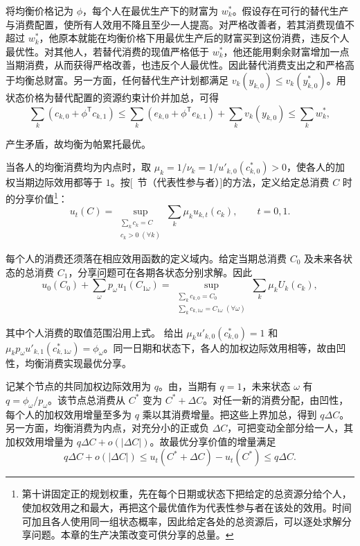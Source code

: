 \begin{solution}[label-content={证明},blank-type=none]
将均衡价格记为 $\phi$，每个人在最优生产下的财富为 $w_k^*$。假设存在可行的替代生产与消费配置，使所有人效用不降且至少一人提高。对严格改善者，若其消费现值不超过 $w_k^*$，他原本就能在均衡价格下用最优生产后的财富买到这份消费，违反个人最优性。对其他人，若替代消费的现值严格低于 $w_k^*$，他还能用剩余财富增加一点当期消费，从而获得严格改善，也违反个人最优性。因此替代消费支出之和严格高于均衡总财富。另一方面，任何替代生产计划都满足 $v_k(y_{k,0})\le v_k(y_{k,0}^*)$。用状态价格为替代配置的资源约束计价并加总，可得
\[
 \sum_k(c_{k,0}+\phi^{\mathsf T}c_{k,1})
 \le\sum_k(e_{k,0}+\phi^{\mathsf T}e_{k,1})+\sum_kv_k(y_{k,0})
 \le\sum_kw_k^*,
\]

产生矛盾，故均衡为帕累托最优。

当各人的均衡消费均为内点时，取 $\mu_k=1/\nu_k=1/u'_{k,0}(c_{k,0}^*)>0$，使各人的加权当期边际效用都等于 $1$。按[~节（代表性参与者）]的方法，定义给定总消费 $C$ 时的分享价值\footnote{第十讲固定正的规划权重，先在每个日期或状态下把给定的总资源分给个人，使加权效用之和最大，再把这个最优值作为代表性参与者在该处的效用。时间可加且各人使用同一组状态概率，因此给定各处的总资源后，可以逐处求解分享问题。本章的生产决策改变可供分享的总量。}：
\[
 u_t(C)=\sup_{\substack{\sum_k c_k=C\\ c_k>0\;(\forall k)}}
        \sum_k\mu_k u_{k,t}(c_k),\qquad t=0,1.
\]

每个人的消费还须落在相应效用函数的定义域内。给定当期总消费 $C_0$ 及未来各状态的总消费 $C_1$，分享问题可在各期各状态分别求解。因此
\[
 u_0(C_0)+\sum_\omega p_\omega u_1(C_{1\omega})
 =\sup_{\substack{\sum_k c_{k,0}=C_0\\
                  \sum_k c_{k,1\omega}=C_{1\omega}\;(\forall\omega)}}
   \sum_k\mu_k U_k(c_k),
\]

其中个人消费的取值范围沿用上式。 给出 $\mu_k u'_{k,0}(c_{k,0}^*)=1$ 和 $\mu_k p_\omega u'_{k,1}(c_{k,1\omega}^*)=\phi_\omega$。同一日期和状态下，各人的加权边际效用相等，故由凹性，均衡消费实现最优分享。

记某个节点的共同加权边际效用为 $q$。由，当期有 $q=1$，未来状态 $\omega$ 有 $q=\phi_\omega/p_\omega$。该节点总消费从 $C^*$ 变为 $C^*+\Delta C$。对任一新的消费分配，由凹性，每个人的加权效用增量至多为 $q$ 乘以其消费增量。把这些上界加总，得到 $q\Delta C$。另一方面，均衡消费为内点，对充分小的正或负 $\Delta C$，可把变动全部分给一人，其加权效用增量为 $q\Delta C+o(|\Delta C|)$。故最优分享价值的增量满足
\[
 q\Delta C+o(|\Delta C|)
 \le u_t(C^*+\Delta C)-u_t(C^*)\le q\Delta C.
\]


\end{solution}
